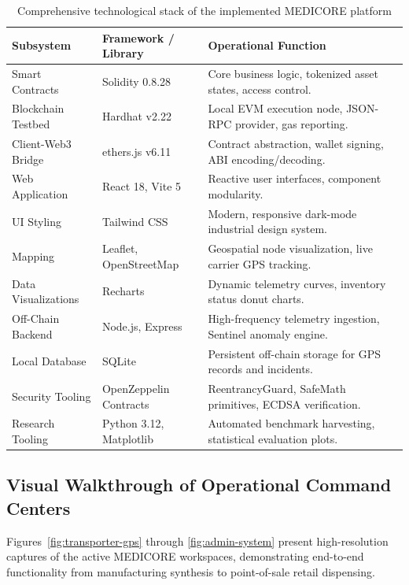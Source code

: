 \documentclass[pdflatex,sn-mathphys-num]{sn-jnl}
\theoremstyle{thmstyleone}
\theoremstyle{thmstyletwo}
\theoremstyle{thmstylethree}
\begin{document}
\begin{table}[htbp]
\centering
\caption{Comprehensive technological stack of the implemented MEDICORE platform}
\label{tab:tech-stack}
\vspace{0.5em}
\begin{tabularx}{\textwidth}{llX}
\toprule
\textbf{Subsystem} & \textbf{Framework / Library} & \textbf{Operational Function} \\
\midrule
Smart Contracts & Solidity 0.8.28 & Core business logic, tokenized asset states, access control. \\
Blockchain Testbed & Hardhat v2.22 & Local EVM execution node, JSON-RPC provider, gas reporting. \\
Client-Web3 Bridge & ethers.js v6.11 & Contract abstraction, wallet signing, ABI encoding/decoding. \\
Web Application & React 18, Vite 5 & Reactive user interfaces, component modularity. \\
UI Styling & Tailwind CSS & Modern, responsive dark-mode industrial design system. \\
Mapping & Leaflet, OpenStreetMap & Geospatial node visualization, live carrier GPS tracking. \\
Data Visualizations & Recharts & Dynamic telemetry curves, inventory status donut charts. \\
Off-Chain Backend & Node.js, Express & High-frequency telemetry ingestion, Sentinel anomaly engine. \\
Local Database & SQLite & Persistent off-chain storage for GPS records and incidents. \\
Security Tooling & OpenZeppelin Contracts & ReentrancyGuard, SafeMath primitives, ECDSA verification. \\
Research Tooling & Python 3.12, Matplotlib & Automated benchmark harvesting, statistical evaluation plots. \\
\bottomrule
\end{tabularx}
\end{table}

\subsection{Visual Walkthrough of Operational Command Centers}

Figures~\ref{fig:transporter-gps} through \ref{fig:admin-system} present high-resolution captures of the active MEDICORE workspaces, demonstrating end-to-end functionality from manufacturing synthesis to point-of-sale retail dispensing.
\end{document}
